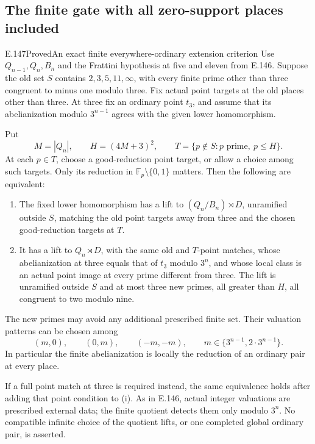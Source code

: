 \subsection{The finite gate with all zero-support places included}

\begin{result}{E.147}{Proved}{An exact finite everywhere-ordinary extension criterion}
Use \(Q_{n-1},Q_n,B_n\) and the Frattini hypothesis
at five and eleven from E.146. Suppose the old set
\(S\) contains \(2,3,5,11,\infty\), with every
finite prime other than three congruent to minus
one modulo three. Fix actual point targets at
the old places other than three. At three fix
an ordinary point \(t_3\), and assume that its
abelianization modulo \(3^{n-1}\) agrees with
the given lower homomorphism.

Put
\[
 M=|Q_n|,\qquad H=(4M+3)^2,\qquad
 T=\{p\notin S:p\text{ prime},\ p\le H\}.
 \tag{E.147.1}
\]
At each \(p\in T\), choose a good-reduction
point target, or allow a choice among such
targets. Only its reduction in
\(\mathbb F_p\setminus\{0,1\}\) matters.
Then the following are equivalent:
\begin{enumerate}[label=(\roman*)]
\item The fixed lower homomorphism has a lift
to \((Q_n/B_n)\rtimes D\), unramified outside
\(S\), matching the old point targets away
from three and the chosen good-reduction
targets at \(T\).
\item It has a lift to \(Q_n\rtimes D\),
with the same old and \(T\)-point matches,
whose abelianization at three equals that
of \(t_3\) modulo \(3^n\), and whose local
class is an actual point image at every
prime different from three. The lift is
unramified outside \(S\) and at most three
new primes, all greater than \(H\), all
congruent to two modulo nine.
\end{enumerate}
The new primes may avoid any additional
prescribed finite set. Their valuation
patterns can be chosen among
\[
 (m,0),\qquad (0,m),\qquad (-m,-m),
       \qquad m\in\{3^{n-1},2\cdot3^{n-1}\}.
 \tag{E.147.2}
\]
In particular the finite abelianization is
locally the reduction of an ordinary pair
at every place.

If a full point match at three is required
instead, the same equivalence holds after
adding that point condition to (i).
As in E.146, actual integer valuations are
prescribed external data; the finite quotient
detects them only modulo \(3^n\).
No compatible infinite choice of the quotient
lifts, or one completed global ordinary pair,
is asserted.
\end{result}
